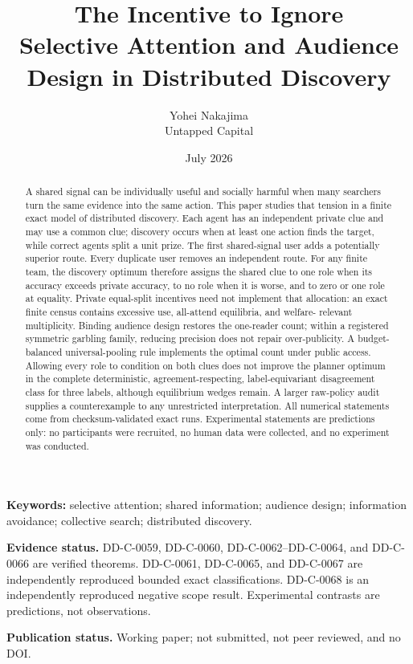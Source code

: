 \documentclass[11pt]{article}
\title{\textbf{The Incentive to Ignore}\\[0.35em]\large Selective Attention and Audience Design in Distributed Discovery}
\author{Yohei Nakajima\\Untapped Capital}
\date{July 2026}
\newcommand{\Evidence}[1]{\par\noindent\textbf{Evidence status.} #1\par}
\begin{document}
\maketitle

\begin{abstract}
A shared signal can be individually useful and socially harmful when many
searchers turn the same evidence into the same action. This paper studies that
tension in a finite exact model of distributed discovery. Each agent has an
independent private clue and may use a common clue; discovery occurs when at
least one action finds the target, while correct agents split a unit prize. The
first shared-signal user adds a potentially superior route. Every duplicate
user removes an independent route. For any finite team, the discovery optimum
therefore assigns the shared clue to one role when its accuracy exceeds private
accuracy, to no role when it is worse, and to zero or one role at equality.
Private equal-split incentives need not implement that allocation: an exact
finite census contains excessive use, all-attend equilibria, and welfare-
relevant multiplicity. Binding audience design restores the one-reader count;
within a registered symmetric garbling family, reducing precision does not
repair over-publicity. A budget-balanced universal-pooling rule implements the
optimal count under public access. Allowing every role to condition on both
clues does not improve the planner optimum in the complete deterministic,
agreement-respecting, label-equivariant disagreement class for three labels,
although equilibrium wedges remain. A larger raw-policy audit supplies a
counterexample to any unrestricted interpretation. All numerical statements
come from checksum-validated exact runs. Experimental statements are
predictions only: no participants were recruited, no human data were collected,
and no experiment was conducted.
\end{abstract}

\noindent\textbf{Keywords:} selective attention; shared information; audience
design; information avoidance; collective search; distributed discovery.

\Evidence{DD-C-0059, DD-C-0060, DD-C-0062--DD-C-0064, and DD-C-0066 are
verified theorems. DD-C-0061, DD-C-0065, and DD-C-0067 are independently
reproduced bounded exact classifications. DD-C-0068 is an independently
reproduced negative scope result. Experimental contrasts are predictions, not
observations.}
\noindent\textbf{Publication status.} Working paper; not submitted, not peer
reviewed, and no DOI.
\end{document}
